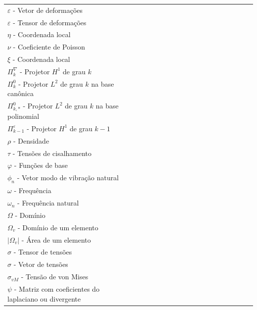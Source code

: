 \begin{listasimb}
\begin{longtable}[l]{p{0.5\linewidth}p{15.0\linewidth}}
$\varepsilon$ - Vetor de deformações \\
$\varepsilon$ - Tensor de deformações \\
$\eta$ - Coordenada local \\
$\nu$ - Coeficiente de Poisson \\
$\xi$ - Coordenada local \\
$\Pi_k^\nabla$ - Projetor $H^1$ de grau $k$ \\
$\Pi_k^0$ - Projetor $L^2$ de grau $k$ na base canônica \\
$\Pi_{k,*}^0$ - Projetor $L^2$ de grau $k$ na base polinomial \\
$\Pi_{k-1}^\varepsilon$ - Projetor $H^1$ de grau $k-1$ \\
$\rho$ - Densidade \\
$\tau$ - Tensões de cisalhamento \\
$\varphi$ - Funções de base \\
$\phi_n$ - Vetor modo de vibração natural \\
$\omega$ - Frequência \\
$\omega_n$ - Frequência natural \\
$\Omega$ - Domínio \\
$\Omega_v$ - Domínio de um elemento \\
$|\Omega_v|$ - Área de um elemento \\
$\mathbb{\sigma}$ - Tensor de tensões \\
$\sigma$ - Vetor de tensões \\
$\sigma_{vM}$ - Tensão de von Mises \\
$\psi$ - Matriz com coeficientes do laplaciano ou divergente \\


\end{longtable}

\end{listasimb}

